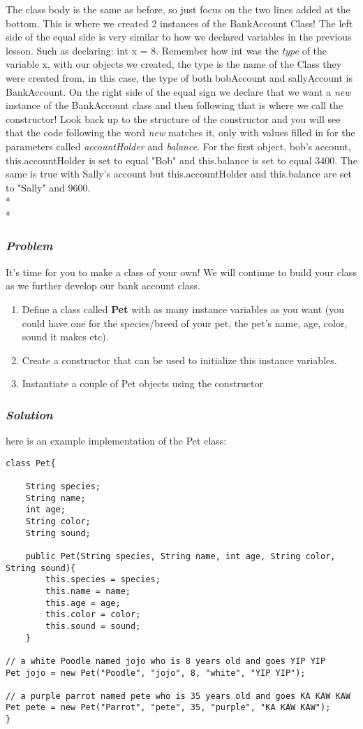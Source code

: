 \documentclass[14pt]{extreport}%
\begin{document}
The class body is the same as before, so just focus on the two lines added at the bottom. This is where we created 2 instances of the BankAccount Class! The left side of the equal side is very similar to how we declared variables in the previous lesson. Such as declaring: int x = 8. Remember how int was the \textit{type} of the variable x, with our objects we created, the type is the name of the Class they were created from, in this case, the type of both bobAccount and sallyAccount is BankAccount. On the right side of the equal sign we declare that we want a \textit{new} instance of the BankAccount class and then following that is where we call the constructor! Look back up to the structure of the constructor and you will see that the code following the word \textit{new} matches it, only with values filled in for the parameters called \textit{accountHolder} and \textit{balance}. For the first object, bob's account, this.accountHolder is set to equal "Bob" and this.balance is set to equal 3400. The same is true with Sally's account but this.accountHolder and this.balance are set to "Sally" and 9600. \\*\\*

\subsubsection{\textit{Problem}}
It's time for you to make a class of your own! We will continue to build your class as we further develop our bank account class. 
\begin{enumerate}
    \item Define a class called \textbf{Pet} with as many instance variables as you want (you could have one for the species/breed of your pet, the pet's name, age, color, sound it makes etc).
    \item Create a constructor that can be used to initialize this instance variables.
    \item Instantiate a couple of Pet objects using the constructor
\end{enumerate}{}
 

\subsubsection{\textit{Solution}}
here is an example implementation of the Pet class:

\begin{lstlisting}
class Pet{

    String species;
    String name;
    int age;
    String color;
    String sound;

    public Pet(String species, String name, int age, String color, String sound){
        this.species = species;
        this.name = name;
        this.age = age;
        this.color = color;
        this.sound = sound;
    }

// a white Poodle named jojo who is 8 years old and goes YIP YIP
Pet jojo = new Pet("Poodle", "jojo", 8, "white", "YIP YIP");

// a purple parrot named pete who is 35 years old and goes KA KAW KAW
Pet pete = new Pet("Parrot", "pete", 35, "purple", "KA KAW KAW");
}
\end{lstlisting}{}
\end{document}
